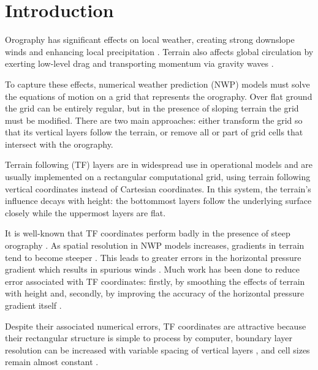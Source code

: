 \chapter{Introduction}

Orography has significant effects on local weather, creating strong downslope winds and enhancing local precipitation \autocite{barry2008}.  Terrain also affects global circulation by exerting low-level drag \autocite{lott-miller1997} and transporting momentum via gravity waves \autocite{mcfarlane1987}.  

To capture these effects, numerical weather prediction (NWP) models must solve the equations of motion on a grid that represents the orography.
Over flat ground the grid can be entirely regular, but in the presence of sloping terrain the grid must be modified.  There are two main approaches: either transform the grid so that its vertical layers follow the terrain, or remove all or part of grid cells that intersect with the orography.

Terrain following (TF) layers are in widespread use in operational models and are usually implemented on a rectangular computational grid, using terrain following vertical coordinates instead of Cartesian coordinates.  In this system, the terrain's influence decays with height: the bottommost layers follow the underlying surface closely while the uppermost layers are flat.

It is well-known that TF coordinates perform badly in the presence of steep orography \autocite{gary1973}.  As spatial resolution in NWP models increases, gradients in terrain tend to become steeper \autocite{steppeler2002}.  This leads to greater errors in the horizontal pressure gradient which results in spurious winds \autocite{dempsey-davis1998}.  Much work has been done to reduce error associated with TF coordinates: firstly, by smoothing the effects of terrain with height \parencites{simmons-burridge1981}{schaer2002}{leuenberger2010}{klemp2011} and, secondly, by improving the accuracy of the horizontal pressure gradient itself \parencites{mahrer1984}{klemp2011}{zaengl2012}.

Despite their associated numerical errors, TF coordinates are attractive because their rectangular structure is simple to process by computer, boundary layer resolution can be increased with variable spacing of vertical layers \autocite{schaer2002}, and cell sizes remain almost constant \autocite{jebens2011}.

